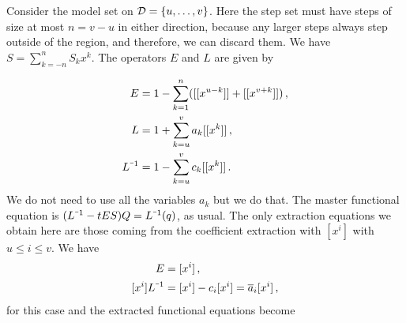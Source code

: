 
\begin{exa} Consider the \oneD model set on $\mathcal{D} = \{u,\ldots, v\}$. Here the step set must have steps of size at most $n = v-u$ in either direction, because any larger steps always step outside of the region, and therefore, we can discard them. We have $S = \sum_{k= -n}^n S_k x^k$. The operators $E$ and $L$ are given by

\begin{align}
	E & = 1 - \sum_{k=1}^n ([[x^{u-k}]]  + [[x^{v + k}]])\,,\\
	L & = 1 + \sum_{k=u}^v a_k [[x^k]]\,,\\
	L^{\um 1} &= 1 - \sum_{k=u}^v c_k [[x^k]]\,.
\end{align}
We do not need to use all the variables $a_k$ but we do that. The master functional equation is $(L^{\um 1} - t ES)Q = L^{\um 1}(q)$, as usual. The only extraction equations we obtain here are those coming from the coefficient extraction with $[x^i]$ with $u \leq i \leq v$. We have
\begin{align}
	[x^i]E & = [x^i]\,,\\
	[x^i]L^{\um 1} &= [x^i] - c_i [x^i] = \ol a_i [x^i]\,,
\end{align}
for this case and the extracted functional equations become


\end{exa}
